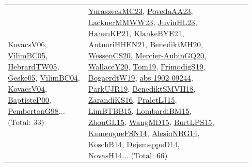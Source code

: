 {\begin{longtable}{lp{3cm}>{\raggedright}p{6cm}>{\raggedright}p{6cm}p{8cm}}
\href{papers/KovacsV06.pdf}{KovacsV06}\cite{KovacsV06}, \href{articles/VilimBC05.pdf}{VilimBC05}\cite{VilimBC05}, \href{papers/HebrardTW05.pdf}{HebrardTW05}\cite{HebrardTW05}, \href{papers/Geske05.pdf}{Geske05}\cite{Geske05}, \href{papers/VilimBC04.pdf}{VilimBC04}\cite{VilimBC04}, \href{papers/KovacsV04.pdf}{KovacsV04}\cite{KovacsV04}, \href{articles/BaptisteP00.pdf}{BaptisteP00}\cite{BaptisteP00}, \href{papers/PembertonG98.pdf}{PembertonG98}\cite{PembertonG98}... (Total: 33) & \href{papers/YuraszeckMC23.pdf}{YuraszeckMC23}\cite{YuraszeckMC23}, \href{papers/PovedaAA23.pdf}{PovedaAA23}\cite{PovedaAA23}, \href{articles/LacknerMMWW23.pdf}{LacknerMMWW23}\cite{LacknerMMWW23}, \href{papers/JuvinHL23.pdf}{JuvinHL23}\cite{JuvinHL23}, \href{papers/HanenKP21.pdf}{HanenKP21}\cite{HanenKP21}, \href{papers/KlankeBYE21.pdf}{KlankeBYE21}\cite{KlankeBYE21}, \href{papers/AntuoriHHEN21.pdf}{AntuoriHHEN21}\cite{AntuoriHHEN21}, \href{articles/BenediktMH20.pdf}{BenediktMH20}\cite{BenediktMH20}, \href{papers/WessenCS20.pdf}{WessenCS20}\cite{WessenCS20}, \href{papers/Mercier-AubinGQ20.pdf}{Mercier-AubinGQ20}\cite{Mercier-AubinGQ20}, \href{articles/WallaceY20.pdf}{WallaceY20}\cite{WallaceY20}, \href{papers/Tom19.pdf}{Tom19}\cite{Tom19}, \href{papers/FrimodigS19.pdf}{FrimodigS19}\cite{FrimodigS19}, \href{papers/BogaerdtW19.pdf}{BogaerdtW19}\cite{BogaerdtW19}, \href{articles/abs-1902-09244.pdf}{abs-1902-09244}\cite{abs-1902-09244}, \href{papers/ParkUJR19.pdf}{ParkUJR19}\cite{ParkUJR19}, \href{papers/BenediktSMVH18.pdf}{BenediktSMVH18}\cite{BenediktSMVH18}, \href{articles/ZarandiKS16.pdf}{ZarandiKS16}\cite{ZarandiKS16}, \href{papers/PraletLJ15.pdf}{PraletLJ15}\cite{PraletLJ15}, \href{papers/LimBTBB15.pdf}{LimBTBB15}\cite{LimBTBB15}, \href{papers/LombardiBM15.pdf}{LombardiBM15}\cite{LombardiBM15}, \href{papers/ZhouGL15.pdf}{ZhouGL15}\cite{ZhouGL15}, \href{articles/WangMD15.pdf}{WangMD15}\cite{WangMD15}, \href{papers/BurtLPS15.pdf}{BurtLPS15}\cite{BurtLPS15}, \href{articles/KameugneFSN14.pdf}{KameugneFSN14}\cite{KameugneFSN14}, \href{papers/AlesioNBG14.pdf}{AlesioNBG14}\cite{AlesioNBG14}, \href{papers/KoschB14.pdf}{KoschB14}\cite{KoschB14}, \href{papers/DejemeppeD14.pdf}{DejemeppeD14}\cite{DejemeppeD14}, \href{articles/NovasH14.pdf}{NovasH14}\cite{NovasH14}... (Total: 66)\\

\end{longtable}}
